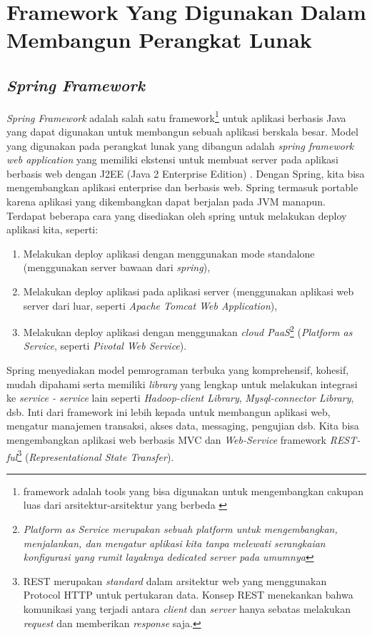 	
\section{Framework Yang Digunakan Dalam Membangun Perangkat Lunak}

\subsection{\textit{Spring Framework}}
\label{subsec:Spring Framework}

\textit{Spring Framework} adalah salah satu framework\footnote{framework adalah tools yang bisa digunakan untuk mengembangkan cakupan luas dari arsitektur-arsitektur yang berbeda \cite{setiawan2009pemilihan}} untuk aplikasi berbasis Java yang dapat digunakan untuk membangun sebuah aplikasi berskala besar. Model yang digunakan pada perangkat lunak yang dibangun adalah \textit{spring framework web application} yang memiliki ekstensi untuk membuat server pada aplikasi berbasis web dengan J2EE (Java 2 Enterprise Edition) \cite{SpringCommerceToha:2010}. Dengan Spring, kita bisa mengembangkan aplikasi enterprise dan berbasis web. Spring termasuk portable karena aplikasi yang dikembangkan dapat berjalan pada JVM manapun. Terdapat beberapa cara yang disediakan oleh spring untuk melakukan deploy aplikasi kita, seperti: 
\begin{enumerate}
	\item Melakukan deploy aplikasi dengan menggunakan mode standalone (menggunakan server bawaan dari \textit{spring}),
	\item Melakukan deploy aplikasi pada aplikasi server (menggunakan aplikasi web server dari luar, seperti \textit{Apache Tomcat Web Application}),
	\item Melakukan deploy aplikasi dengan menggunakan \textit{cloud PaaS}\footnote{\textit{Platform as Service merupakan sebuah platform untuk mengembangkan, menjalankan, dan mengatur aplikasi kita tanpa melewati serangkaian konfigurasi yang rumit layaknya \textit{dedicated server} pada umumnya}} (\textit{Platform as Service}, seperti \textit{Pivotal Web Service}).
\end{enumerate}
Spring menyediakan model pemrograman terbuka yang komprehensif, kohesif, mudah dipahami serta memiliki \textit{library} yang lengkap untuk melakukan integrasi ke \textit{service - service} lain seperti \textit{Hadoop-client Library}, \textit{Mysql-connector Library}, dsb. Inti dari framework ini lebih kepada untuk membangun aplikasi web, mengatur manajemen transaksi, akses data, messaging, pengujian dsb. Kita bisa mengembangkan aplikasi web berbasis MVC dan \textit{Web-Service} framework \textit{REST-ful}\footnote{REST merupakan \textit{standard} dalam arsitektur web yang menggunakan Protocol HTTP untuk pertukaran data.  Konsep REST menekankan bahwa komunikasi yang terjadi antara \textit{client} dan \textit{server} hanya sebatas melakukan \textit{request} dan memberikan \textit{response} saja.} (\textit{Representational State Transfer}).

